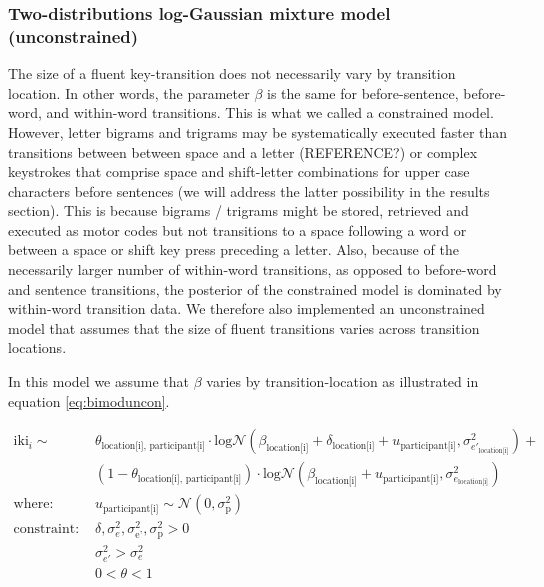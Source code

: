 \documentclass[
  man,floatsintext]{apa7}
\begin{document}
\hypertarget{two-distributions-log-gaussian-mixture-model-unconstrained}{%
\subsubsection{Two-distributions log-Gaussian mixture model (unconstrained)}\label{two-distributions-log-gaussian-mixture-model-unconstrained}}

The size of a fluent key-transition does not necessarily vary by transition location. In other words, the parameter \(\beta\) is the same for before-sentence, before-word, and within-word transitions. This is what we called a constrained model. However, letter bigrams and trigrams may be systematically executed faster than transitions between between space and a letter (REFERENCE?) or complex keystrokes that comprise space and shift-letter combinations for upper case characters before sentences (we will address the latter possibility in the results section). This is because bigrams / trigrams might be stored, retrieved and executed as motor codes but not transitions to a space following a word or between a space or shift key press preceding a letter. Also, because of the necessarily larger number of within-word transitions, as opposed to before-word and sentence transitions, the posterior of the constrained model is dominated by within-word transition data. We therefore also implemented an unconstrained model that assumes that the size of fluent transitions varies across transition locations.

In this model we assume that \(\beta\) varies by transition-location as illustrated in equation \ref{eq:bimoduncon}.

\begin{equation}
\begin{aligned}
\label{eq:bimoduncon}
\text{iki}_{i} \sim\text{ } & \theta_\text{location[i], participant[i]} \cdot \text{log}\mathcal{N}(\beta_\text{location[i]} + \delta_\text{location[i]} + u_\text{participant[i]}, \sigma_{e'_\text{location[i]}}^2) + \\
  & (1 - \theta_\text{location[i], participant[i]}) \cdot \text{log}\mathcal{N}(\beta_\text{location[i]} + u_\text{participant[i]}, \sigma_{e_\text{location[i]}}^2)\\
    \text{where: }  & u_\text{participant[i]} \sim \mathcal{N}(0, \sigma_\text{p}^2) \\
\text{constraint: } & \delta, \sigma_{e}^2, \sigma_\text{e'}^2, \sigma_\text{p}^2>0\\
        & \sigma_{e'}^2 > \sigma_{e}^2\\
        & 0 < \theta < 1
\end{aligned}
\end{equation}
\end{document}
